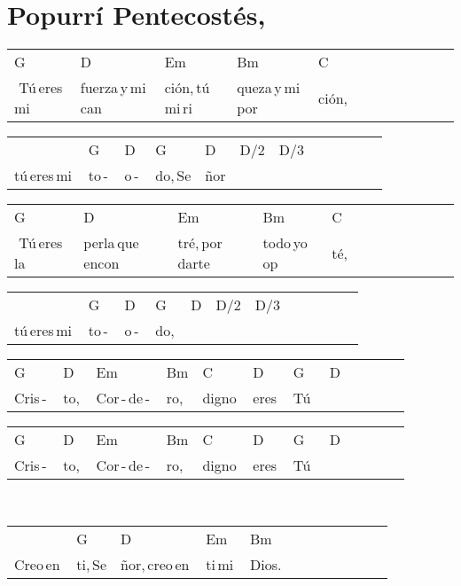 \section*{Popurrí Pentecostés, \hfill}
\begin{multicols}{2}
\noindent
\begin{minipage}{\columnwidth}
\noindent
\noindent
\begin{tabular}{llllllllllll}
G&D&Em&Bm&C\\
\,\,Tú\,eres\,mi\,&fuerza\,y\,mi\,can&ción,\,tú\,mi\,ri&queza\,y\,mi\,por&ción,
\end{tabular}

\noindent
\begin{tabular}{llllllllllll}
&G&D&G&D&D{/}2&D{/}3\\
tú\,eres\,mi\,&to\,-\,&o\,-\,&do,\,Se&ñor\qquad&\,\qquad\,&
\end{tabular}

\noindent
\begin{tabular}{llllllllllll}
G&D&Em&Bm&C\\
\,\,Tú\,eres\,la\,&perla\,que\,encon&tré,\,por\,darte\,&todo\,yo\,op&té,
\end{tabular}

\noindent
\begin{tabular}{llllllllllll}
&G&D&G&D&D{/}2&D{/}3\\
tú\,eres\,mi\,&to\,-\,&o\,-\,&do,\,&\,\qquad\,&\,\qquad\,&
\end{tabular}

\noindent
\begin{tabular}{llllllllllll}
G&D&Em&Bm&C&D&G&D\\
Cris\,-\,&to,\,&Cor\,-\,de\,-\,&ro,\,\quad\,&digno\,&eres\,&Tú\,\,&
\end{tabular}

\noindent
\begin{tabular}{llllllllllll}
G&D&Em&Bm&C&D&G&D\\
Cris\,-\,&to,\,&Cor\,-\,de\,-\,&ro,\,\quad\,&digno\,&eres\,&Tú\,\,&
\end{tabular}
\end{minipage}\\

\noindent
\begin{minipage}{\columnwidth}
\noindent
\noindent
\begin{tabular}{llllllllllll}
&G&D&Em&Bm\\
Creo\,en\,&ti,\,Se&ñor,\,creo\,en\,&ti\,mi\,&Dios.
\end{tabular}


\end{minipage}
\end{multicols}
